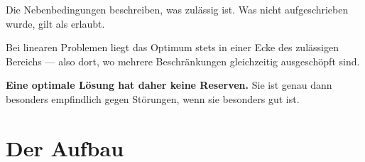 \begin{warnung}
Die Nebenbedingungen beschreiben, was zulässig ist. Was nicht aufgeschrieben wurde, gilt als erlaubt.

\begin{center}
\begin{minipage}{0.88\textwidth}
\end{minipage}
\end{center}
\end{warnung}

\begin{warnung}
Bei linearen Problemen liegt das Optimum stets in einer Ecke des zulässigen Bereichs --- also dort, wo mehrere Beschränkungen gleichzeitig ausgeschöpft sind.

\begin{center}
\begin{minipage}{0.9\textwidth}
\textbf{Eine optimale Lösung hat daher keine Reserven.} Sie ist genau dann besonders empfindlich gegen Störungen, wenn sie besonders gut ist.
\end{minipage}
\end{center}

\begin{center}
\begin{minipage}{0.88\textwidth}
\end{minipage}
\end{center}
\end{warnung}

\section*{Der Aufbau}

